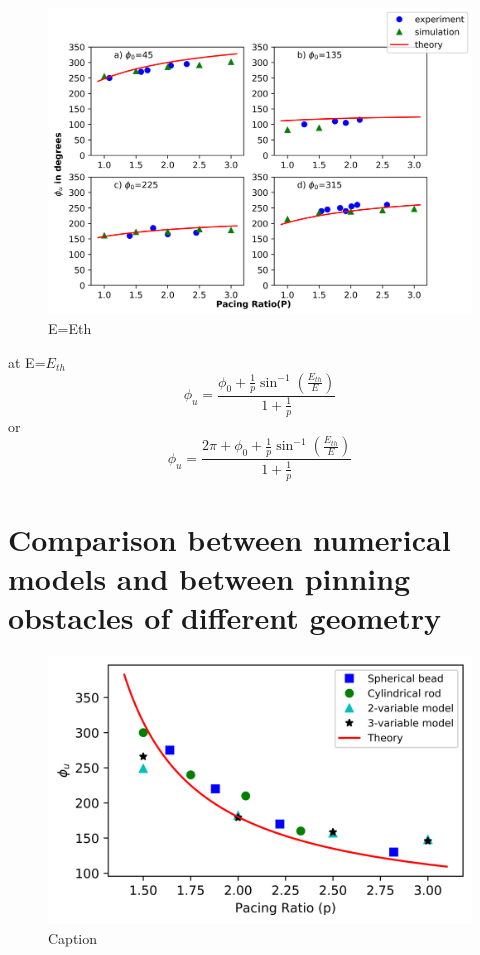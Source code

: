 \documentclass[%
 preprint,
 amsmath,amssymb,
 aps,
]{revtex4-2}
\begin{document}
\begin{figure}[H]
    \centering
    \includegraphics{appendix_cw_Eth.png}
    \caption{E=Eth}
    \label{fig:unpinning_cw}
\end{figure}
at E=$E_{th}$
\begin{equation}
    \phi_{u} = \frac{\phi_{0}+\frac{1}{p}{\sin^{-1}} (\frac{E_{th}}{E})}{1+\frac{1}{p}}
    \label{eq:basic_eqn_cw}
\end{equation}
\centering or 
\begin{equation}
    \phi_{u} = \frac{2\pi+\phi_{0}+\frac{1}{p}{\sin^{-1}} (\frac{E_{th}}{E})}{1+\frac{1}{p}}
    \label{eq:basic_eqn_cw}
\end{equation}
\fi


\section{Comparison between numerical models and between pinning obstacles of different geometry}

\begin{figure}[H]
    \centering
    \includegraphics{appendix_23oregonator_beadrod.png}
    \caption{Caption}
    \label{fig:unpinning_comparison}
\end{figure}


\nocite{*}

\end{document}
